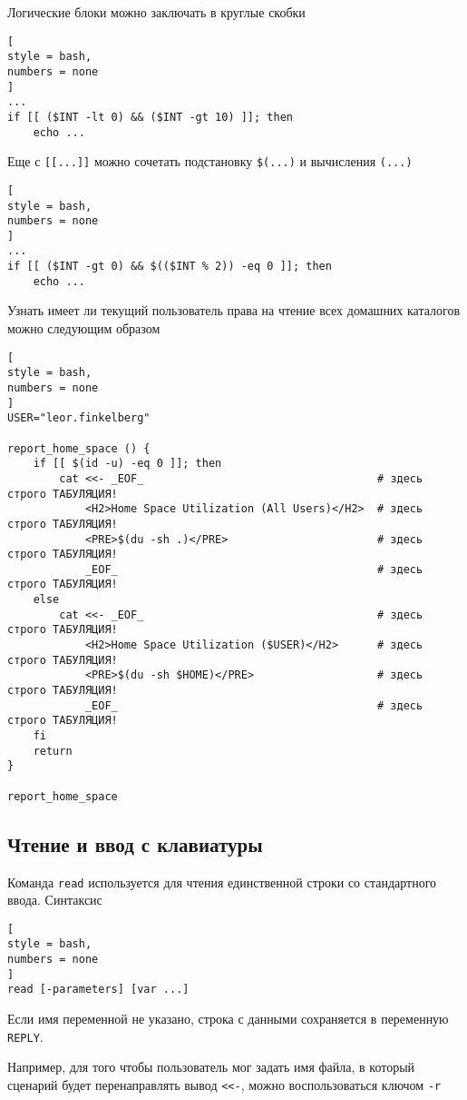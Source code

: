 \documentclass[%
	11pt,
	a4paper,
	utf8,
		]{article}
\begin{document}
Логические блоки можно заключать в круглые скобки
\begin{lstlisting}[
style = bash,
numbers = none
]
...
if [[ ($INT -lt 0) && ($INT -gt 10) ]]; then
    echo ...
\end{lstlisting}

Еще с \verb|[[...]]| можно сочетать подстановку \verb|$(...)| и вычисления \verb|(...)|
\begin{lstlisting}[
style = bash,
numbers = none
]
...
if [[ ($INT -gt 0) && $(($INT % 2)) -eq 0 ]]; then
    echo ...
\end{lstlisting}

Узнать имеет ли текущий пользователь права на чтение всех домашних каталогов можно следующим образом
\begin{lstlisting}[
style = bash,
numbers = none
]
USER="leor.finkelberg"

report_home_space () {
    if [[ $(id -u) -eq 0 ]]; then
        cat <<- _EOF_                                    # здесь строго ТАБУЛЯЦИЯ!
            <H2>Home Space Utilization (All Users)</H2>  # здесь строго ТАБУЛЯЦИЯ!
            <PRE>$(du -sh .)</PRE>                       # здесь строго ТАБУЛЯЦИЯ!
            _EOF_                                        # здесь строго ТАБУЛЯЦИЯ!
    else
        cat <<- _EOF_                                    # здесь строго ТАБУЛЯЦИЯ!
            <H2>Home Space Utilization ($USER)</H2>      # здесь строго ТАБУЛЯЦИЯ!
            <PRE>$(du -sh $HOME)</PRE>                   # здесь строго ТАБУЛЯЦИЯ!
            _EOF_                                        # здесь строго ТАБУЛЯЦИЯ!
    fi
    return    
}

report_home_space
\end{lstlisting}

\subsection{Чтение и ввод с клавиатуры}

Команда \texttt{read} используется для чтения единственной строки со стандартного ввода. Синтаксис
\begin{lstlisting}[
style = bash,
numbers = none
]
read [-parameters] [var ...]
\end{lstlisting}

Если имя переменной не указано, строка с данными сохраняется в переменную \texttt{REPLY}.

Например, для того чтобы пользователь мог задать имя файла, в который сценарий будет перенаправлять вывод \verb|<<-|, можно воспользоваться ключом \texttt{-r}
\end{document}
